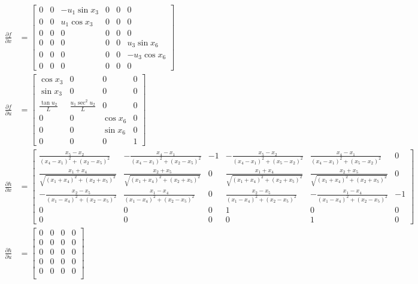 \documentclass[paper=a4, fontsize=11pt]{scrartcl} %
\numberwithin{equation}{section} %
\numberwithin{figure}{section} %
\numberwithin{table}{section} %
\begin{document}
\begin{framed}
\begin{align*}
    \frac{\partial f}{\partial x} &= 
    \begin{bmatrix} 0 & 0 & -u_1\sin x_3 & 0 & 0 & 0 \\ 
                    0 & 0 & u_1\cos x_3 & 0 & 0 & 0 \\ 
                    0 & 0 & 0 & 0 & 0 & 0 \\ 
                    0 & 0 & 0 & 0 & 0 & u_3\sin x_6 \\ 
                    0 & 0 & 0 & 0 & 0 & -u_3 \cos x_6 \\ 
                    0 & 0 & 0 & 0 & 0 & 0 \end{bmatrix} \\
    \frac{\partial f}{\partial u} &= 
      \begin{bmatrix} \cos x_3 & 0 & 0 & 0 \\ 
      \sin x_3 & 0 & 0 & 0 \\ 
      \frac{\tan u_2}{L}  & \frac{u_1\sec^2u_2}{L} & 0 & 0 \\ 
       0 & 0 & \cos x_6 & 0 \\ 
       0 & 0 & \sin x_6 & 0 \\ 
       0 & 0 & 0 & 1 
       \end{bmatrix} \\
    \frac{\partial h}{\partial x} &= 
    \begin{bmatrix} \frac{x_5-x_2}{(x_4-x_1)^2+(x_2-x_5)^2} & -\frac{x_4-x_1}{(x_4-x_1)^2+(x_2-x_5)^2} & -1 & -\frac{x_5-x_2}{(x_4-x_1)^2+(x_5-x_2)^2} & \frac{x_4-x_1}{(x_4-x_1)^2+(x_5-x_2)^2} & 0 \\
    \frac{x_1+x_4}{\sqrt{(x_1+x_4)^2+(x_2+x_5)^2}} & \frac{x_2+x_5}{\sqrt{(x_1+x_4)^2+(x_2+x_5)^2}} & 0 & \frac{x_1 + x_4}{\sqrt{(x_1+x_4)^2+(x_2+x_5)^2}} & \frac{x_2+x_5}{\sqrt{(x_1+x_4)^2+(x_2+x_5)^2}} & 0 \\ 
    -\frac{x_2-x_5}{(x_1-x_4)^2+(x_2-x_5)^2} & \frac{x_1-x_4}{(x_1-x_4)^2+(x_2-x_5)^2} & 0 & \frac{x_2-x_5}{(x_1-x_4)^2+(x_2-x_5)^2} & 
    -\frac{x_1-x_4}{(x_1-x_4)^2+(x_2-x_5)^2} & -1 \\
    0 & 0 & 0 & 1 & 0 & 0 \\ 0 & 0 & 0 & 0 & 1 & 0 \end{bmatrix} \\
    \frac{\partial h}{\partial u} &= 
      \begin{bmatrix} 0 & 0 & 0 & 0  \\ 
                      0 & 0 & 0 & 0  \\ 
                      0 & 0 & 0 & 0  \\ 
                      0 & 0 & 0 & 0  \\ 
                      0 & 0 & 0 & 0  \\ 
                     \end{bmatrix} \\
\end{align*}


\end{framed}
\end{document}
